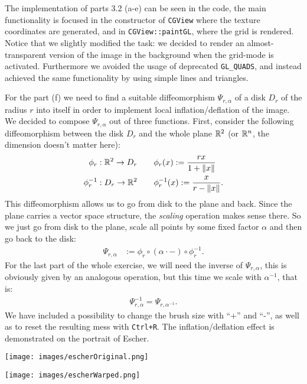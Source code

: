 \documentclass{scrartcl}
\newcommand{\exercise}[2]{\vspace{1em}\noindent{\bf Exercise #1 (#2)}}
\begin{document}
\exercise{3.2}{Texture mapping}
The implementation of parts 3.2 (a-e) can be seen in the code, 
the main functionality is focused in the constructor of \verb|CGView|
where the texture coordinates are generated, and in \verb|CGView::paintGL|,
where the grid is rendered. Notice that we slightly modified the task:
we decided to render an almost-transparent version of the image in the 
background when the grid-mode is activated. Furthermore we avoided the
usage of deprecated \verb|GL_QUADS|, and instead achieved the same 
functionality by using simple lines and triangles.

For the part (f) we need to find a suitable diffeomorphism $\Psi_{r, \alpha}$ 
of a disk $D_r$ of the radius $r$ into itself in order to implement 
local inflation/deflation of the image. 
We decided to compose 
$\Psi_{r, \alpha}$ out of three functions. 
First, consider the following diffeomorphism between the
disk $D_r$ and the whole plane $\mathbb{R}^2$ (or $\mathbb{R}^n$, the dimension doesn't 
matter here):
\begin{align*}
  \phi_r: \mathbb{R}^2 \to D_r       \qquad & \phi_r(x) := \frac{rx}{1 + \left\lVert x\right\rVert} \\
  \phi_r^{-1}:  D_r \to \mathbb{R}^2 \qquad & \phi_r^{-1}(x)  := \frac{x}{r - \left\lVert x\right\rVert}.
\end{align*}
This diffeomorphism allows us to go from disk to the plane and back.
Since the plane carries a vector space structure, the \emph{scaling} operation
makes sense there. So we just go from disk to the plane, scale all points by
some fixed factor $\alpha$ and then go back to the disk:
\begin{align*}
  \Psi_{r, \alpha} & := \phi_r\circ(\alpha \cdot -) \circ \phi_r^{-1}.
\end{align*}
For the last part of the whole exercise, we will need the inverse of $\Psi_{r, \alpha}$,
this is obviously given by an analogous operation, 
but this time we scale with $\alpha^{-1}$, that is:
\begin{align*}
  \Psi_{r, \alpha}^{-1} = \Psi_{r, \alpha^{-1}}.
\end{align*}
We have included a possibility to change the brush size with ``+'' and ``-'', as
well as to reset the resulting mess with \verb|Ctrl+R|.
The inflation/deflation effect is demonstrated on the portrait of Escher.

\begin{minipage}[t]{0.45\linewidth}
  \centering\texttt{[image: images/escherOriginal.png]}
  \label{originalEscher}
\end{minipage}
\hspace{0.1\linewidth}
\begin{minipage}[t]{0.45\linewidth}
  \centering\texttt{[image: images/escherWarped.png]}
  \label{warpedEscher}
\end{minipage}
\end{document}

